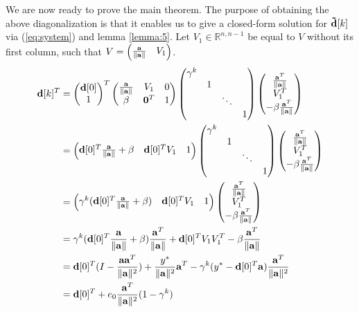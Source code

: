 We are now ready to prove the main theorem. The purpose of obtaining the above diagonalization is that it enables us to give a closed-form solution for $\mathbf{\tilde{d}}[k]$ via (\ref{eq:system}) and lemma \ref{lemma:5}. Let $V_1 \in \mathbb{R}^{n,n-1}$ be equal to $V$ without its first column, such that $V = \begin{pmatrix}\frac{\mathbf{a}}{\|\mathbf{a}\|} & V_1\end{pmatrix}$.
\begin{align*}
\label{eq:diag}
\mathbf{d}[k]^T &= \begin{pmatrix}\mathbf{d}[0] \\ 1\end{pmatrix}^T \begin{pmatrix} \frac{\mathbf{a}}{\|\mathbf{a}\|} & V_1 & 0 \\ \beta & \mathbf{0}^T & 1\end{pmatrix} \begin{pmatrix} \gamma^k & & & \\ & 1 & & \\ & & \ddots & \\ & & & 1 \end{pmatrix} \begin{pmatrix}\frac{\mathbf{a}^T}{\|\mathbf{a}\|} \\ V_1^T \\- \beta \frac{\mathbf{a}^T}{\|\mathbf{a}\|} \end{pmatrix} \\
       &= \begin{pmatrix}\mathbf{d}[0]^T\frac{\mathbf{a}}{\|\mathbf{a}\|} + \beta & \mathbf{d}[0]^T V_1 & 1\end{pmatrix} \begin{pmatrix} \gamma^k & & & \\ & 1 & & \\ & & \ddots & \\ & & & 1 \end{pmatrix} \begin{pmatrix}\frac{\mathbf{a}^T}{\|\mathbf{a}\|} \\ V_1^T \\- \beta \frac{\mathbf{a}^T}{\|\mathbf{a}\|} \end{pmatrix} \\
       &= \begin{pmatrix}\gamma^k(\mathbf{d}[0]^T\frac{\mathbf{a}}{\|\mathbf{a}\|} + \beta) & \mathbf{d}[0]^T V_1 & 1\end{pmatrix} \begin{pmatrix}\frac{\mathbf{a}^T}{\|\mathbf{a}\|} \\ V_1^T \\- \beta \frac{\mathbf{a}^T}{\|\mathbf{a}\|} \end{pmatrix} \\
       &= \gamma^k(\mathbf{d}[0]^T\frac{\mathbf{a}}{\|\mathbf{a}\|} + \beta) \frac{\mathbf{a}^T}{\|\mathbf{a}\|} + \mathbf{d}[0]^T V_1 V_1^T - \beta \frac{\mathbf{a}^T}{\|\mathbf{a}\|} \\
       &= \mathbf{d}[0]^T (I - \frac{\mathbf{a}\mathbf{a}^T}{\|\mathbf{a}\|^2}) + \frac{y^*}{\|\mathbf{a}\|^2} \mathbf{a}^T - \gamma^k(y^* - \mathbf{d}[0]^T \mathbf{a}) \frac{\mathbf{a}^T}{\|\mathbf{a}\|^2} \\
       &= \mathbf{d}[0]^T + e_0 \frac{\mathbf{a}^T}{\|\mathbf{a}\|^2} (1 - \gamma^k)       
\end{align*}

